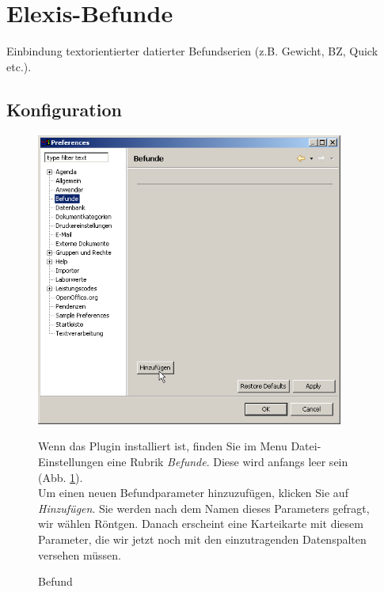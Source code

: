 \section{Elexis-Befunde}
Einbindung textorientierter datierter Befundserien (z.B. Gewicht, BZ, Quick etc.). \subsection{Konfiguration}

\begin{figure}[htbp]
   \begin{minipage}{0.35\textwidth}
       \centering
       \includegraphics[width=0.9\textwidth]{images/befunde1}
       \caption{Befund}
       \label{fig:befundesettings}
     \end{minipage}\hfill
     \begin{minipage}{0.65\textwidth}
     Wenn das Plugin installiert ist, finden Sie im Menu Datei-Einstellungen eine Rubrik \textit{Befunde}. Diese wird anfangs leer sein (Abb. \ref{fig:befundesettings}).\\
     
     Um einen neuen Befundparameter hinzuzufügen, klicken Sie auf  \textit{Hinzufügen}. Sie werden nach dem Namen dieses Parameters gefragt, wir wählen  Röntgen. Danach erscheint eine Karteikarte mit diesem Parameter, die wir jetzt noch mit den einzutragenden Datenspalten versehen müssen.

    \end{minipage}
\end{figure}
